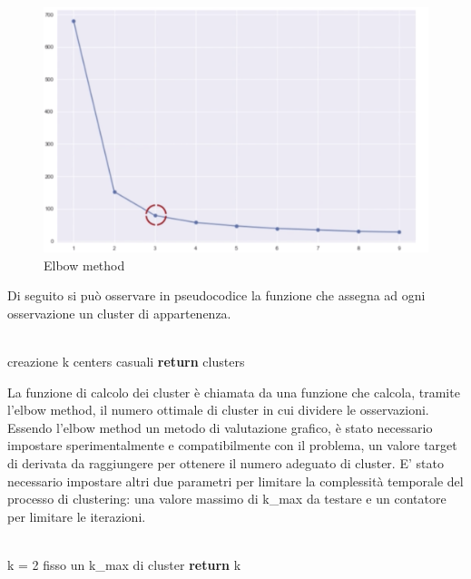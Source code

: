 \documentclass[10pt,a4paper]{article}
\begin{document}
		\begin{figure}[H]
		\centering
		\includegraphics[scale=0.5]{elbow_method.png}
		\caption{Elbow method}
		\end{figure}
		
		Di seguito si può osservare in pseudocodice la funzione che assegna ad ogni osservazione un cluster di appartenenza.\\
		\\
		\begin{algorithm}[H]
		creazione k centers casuali\;
		\textbf{return} clusters
		\end{algorithm}
		
		La funzione di calcolo dei cluster è chiamata da una funzione che calcola, tramite l'elbow method, il numero ottimale di cluster in cui dividere le osservazioni. Essendo l'elbow method un 
		metodo di valutazione grafico, è stato necessario impostare sperimentalmente e compatibilmente con il problema, un valore target di derivata da raggiungere per ottenere il numero adeguato di cluster. 
		E' stato necessario impostare altri due parametri per limitare la complessità temporale del processo di clustering: una valore massimo di k\_{max} da testare e un contatore per limitare le iterazioni.  \\
		\\
		\begin{algorithm}[H]
		k = 2\;
		fisso un k\_{max} di cluster\;
		\textbf{return} k
		\end{algorithm}
		
\end{document}
